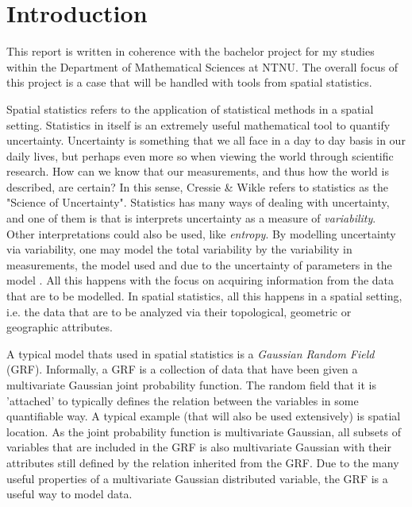 \section{Introduction}

This report is written in coherence with the bachelor project for my studies within the Department of Mathematical Sciences at NTNU. The overall focus of this project is a case that will be handled with tools from spatial statistics. 

Spatial statistics refers to the application of statistical methods in a spatial setting. Statistics in itself is an extremely useful mathematical tool to quantify uncertainty. Uncertainty is something that we all face in a day to day basis in our daily lives, but perhaps even more so when viewing the world through scientific research. How can we know that our measurements, and thus how the world is described, are certain? In this sense, Cressie \& Wikle refers to statistics as the "Science of Uncertainty". Statistics has many ways of dealing with uncertainty, and one of them is that is interprets uncertainty as a measure of \textit{variability}. Other interpretations could also be used, like \textit{entropy}. By modelling uncertainty via variability, one may model the total variability by the variability in measurements, the model used and due to the uncertainty of parameters in the model \cite{CressieEtAl}. All this happens with the focus on acquiring information from the data that are to be modelled. In spatial statistics, all this happens in a spatial setting, i.e. the data that are to be analyzed via their topological, geometric or geographic attributes.

A typical model thats used in spatial statistics is a \textit{Gaussian Random Field} (GRF). Informally, a GRF is a collection of data that have been given a multivariate Gaussian joint probability function. The random field that it is 'attached' to typically defines the relation between the variables in some quantifiable way. A typical example (that will also be used extensively) is spatial location. As the joint probability function is multivariate Gaussian, all subsets of variables that are included in the GRF is also multivariate Gaussian with their attributes still defined by the relation inherited from the GRF. Due to the many useful properties of a multivariate Gaussian distributed variable, the GRF is a useful way to model data. 

